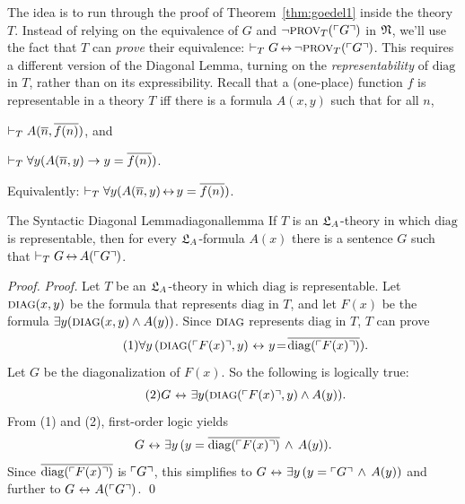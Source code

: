 The idea is to run through the proof of Theorem~\ref{thm:goedel1}
inside the theory $T$.
Instead of relying on the equivalence of $G$ and $\neg \smallcaps{Prov}_T(\gn{G})$ in $\mathfrak{N}$,
we'll use the fact that $T$ can \emph{prove} their equivalence:
$\proves_T G \leftrightarrow \neg \smallcaps{Prov}_T(\gn{G})$.
This requires a different version of the Diagonal Lemma,
turning on the \emph{representability} of $\mathrm{diag}$ in $T$,
rather than on its expressibility.
Recall that a (one-place) function $f$ is representable in a theory $T$ iff
there is a formula $A(x,y)$ such that for all $n$,
\begin{cenumerate}
    \item[(i)] $\vdash_T A(\overline{n},\overline{f(n)})$, and
    \item[(ii)] $\vdash_T \forall y (A(\overline{n},y) \rightarrow y = \overline{f(n)})$.
\end{cenumerate}
Equivalently: $\proves_T \forall y (A(\num{n},y) \leftrightarrow y = \num{f(n)})$.
  
\begin{lemma}{The Syntactic Diagonal Lemma}{diagonallemma}
  If $T$ is an $\mathfrak{L}_A$-theory in which $\mathrm{diag}$ is representable,
  then for every $\mathfrak{L}_A$-formula $A(x)$ there is a sentence $G$
  such that $\vdash_T G \leftrightarrow A(\gn{G})$.
\end{lemma}

\begin{proof}
    \emph{Proof.}
  Let $T$ be an $\mathfrak{L}_A$-theory in which $\mathrm{diag}$ is representable.
  Let $\smallcaps{diag}(x,y)$ be the formula that represents $\mathrm{diag}$ in $T$,
  and let $F(x)$ be the formula $\exists y(\smallcaps{diag}(x,y) \land A(y))$.
  Since $\smallcaps{diag}$ represents $\mathrm{diag}$ in $T$,
  $T$ can prove
  \begin{equation}\tag{1}
    \forall y\, (\smallcaps{diag}(\gn{F(x)},y) \,\leftrightarrow\, y\!=\!\num{\mathrm{diag}(\gn{F(x)})}).
  \end{equation}
  Let $G$ be the diagonalization of $F(x)$.
  So the following is logically true:
  \begin{equation}\tag{2}
    G \,\leftrightarrow\, \exists y(\smallcaps{diag}(\gn{F(x)},y) \land A(y)).
  \end{equation}
  From (1) and (2), first-order logic yields
  \begin{equation*}
    G \,\leftrightarrow\, \exists y\,(y = \num{\mathrm{diag}(\gn{F(x)})} \,\land\, A(y)).
  \end{equation*}
  Since $\overline{\mathrm{diag}(\ulcorner F(x) \urcorner)}$ is $\ulcorner G \urcorner$, this simplifies to
  $G \,\leftrightarrow\, \exists y\,(y = \gn{G} \,\land\, A(y))$
  and further to $G \,\leftrightarrow\, A(\gn{G})$. \qed
\end{proof}

